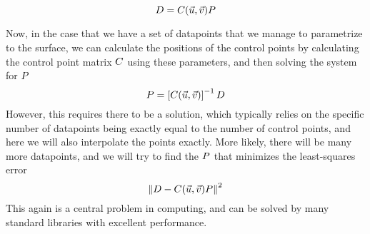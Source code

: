\begin{equation}
\lsDataPointMatrix = \lsControlPointCoefMatrix(\vec{u},\vec{v})\lsControlPointMatrix
\label{eqn:lsmatrix2}
\end{equation}

Now, in the case that we have a set of datapoints that we manage to parametrize to the surface, we can calculate the positions of the control points by calculating the control point matrix $\lsControlPointCoefMatrix$ using these parameters, and then solving the system for $P$
\begin{equation*}
\lsControlPointMatrix = \left[\lsControlPointCoefMatrix(\vec{u},\vec{v})\right]^{-1}\lsDataPointMatrix
\end{equation*}
However, this requires there to be a solution, which typically relies on the specific number of datapoints being exactly equal to the number of control points, and here we will also interpolate the points exactly. More likely, there will be many more datapoints, and we will try to find the $\lsControlPointMatrix$ that minimizes the least-squares error
\begin{equation}
\norm{\lsDataPointMatrix - \lsControlPointCoefMatrix(\vec{u},\vec{v})\lsControlPointMatrix}^2
\label{eqn:lsminim}
\end{equation}
This again is a central problem in computing, and can be solved by many standard libraries with excellent performance.

